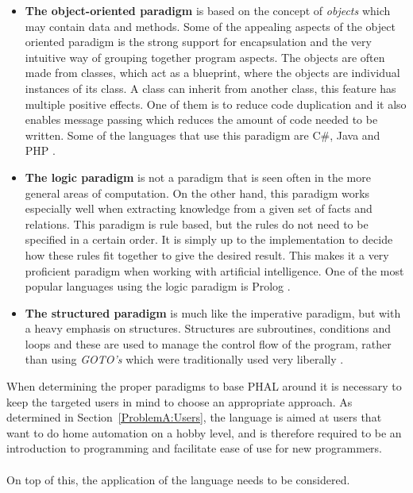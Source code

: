\begin{itemize}
    \item \textbf{The object-oriented paradigm} is based on the concept of \textit{objects} which may contain data and methods. 
    Some of the appealing aspects of the object oriented paradigm is the strong support for encapsulation and the very intuitive way of grouping together program aspects. 
    The objects are often made from classes, which act as a blueprint, where the objects are individual instances of its class. 
    A class can inherit from another class, this feature has multiple positive effects. 
    One of them is to reduce code duplication and it also enables message passing which reduces the amount of code needed to be written.
    Some of the languages that use this paradigm are C\#, Java and PHP \cite{ProgrammingParadigmsDefinition} \cite{ProgrammingParadigmsKurtNormark}.

    \item \textbf{The logic paradigm} is not a paradigm that is seen often in the more general areas of computation. 
    On the other hand, this paradigm works especially well when extracting knowledge from a given set of facts and relations. 
    This paradigm is rule based, but the rules do not need to be specified in a certain order. 
    It is simply up to the implementation to decide how these rules fit together to give the desired result. 
    This makes it a very proficient paradigm when working with artificial intelligence. 
    One of the most popular languages using the logic paradigm is Prolog \cite{Sebesta} \cite{ProgrammingParadigmsDefinition} \cite{ProgrammingParadigmsKurtNormark}.
    
    \item \textbf{The structured paradigm} is much like the imperative paradigm, but with a heavy emphasis on structures. 
    Structures are subroutines, conditions and loops and these are used to manage the control flow of the program, rather than using \textit{GOTO's} which were traditionally used very liberally \cite{ProgrammingParadigmsDefinition}.
\end{itemize}
When determining the proper paradigms to base PHAL around it is necessary to keep the targeted users in mind to choose an appropriate approach. 
As determined in Section~\ref{ProblemA:Users}, the language is aimed at users that want to do home automation on a hobby level, and is therefore required to be an introduction to programming and facilitate ease of use for new programmers.
\\\\ 
On top of this, the application of the language needs to be considered. 
